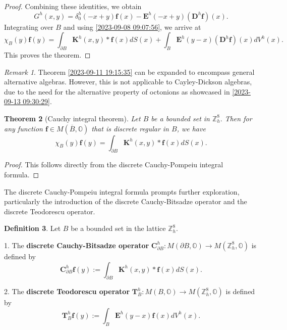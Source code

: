 \documentclass{amsart}
\newtheorem{theorem}{Theorem}[section]
\theoremstyle{definition}
\newtheorem{definition}[theorem]{Definition}
\theoremstyle{remark}
\newtheorem{remark}[theorem]{Remark}
\numberwithin{equation}{section}
\newcommand{\p}{\partial}
\newcommand{\OO}{\mathbb O}
\newcommand{\Z}{\mathbb Z}
\newcommand{\f}{\bm{f}}
\newcommand{\E}{\bm{E}}
\begin{document}
\begin{proof}
Combining these identities, we obtain
\[
G^h(x,y)=\delta_0^h(-x+y)\f(x)- \E^h(-x+y)(\bm D^h \f)(x).
\]
Integrating over \(B\) and using \eqref{2023-09-08 09:07:56}, we arrive at
\[
\chi_B(y)\f(y)=\int_{\p B}\bm K^h(x,y) * \f(x)dS(x)+ \int_B \E^h(y-x)(\bm D^h \f)(x)dV^h(x).
\]
This proves the theorem.
\end{proof}

        \begin{remark}  Theorem    \ref{2023-09-11 19:15:35}
        can be expanded to encompass general alternative algebras. However, this is not applicable to Cayley-Dickson algebras, due to the need for the alternative property of octonions as showcased in \eqref{2023-09-13 09:30:29}.        \end{remark}




     \begin{theorem}
           [Cauchy integral theorem]  Let $B$ be a bounded set in $\Z^8_h.$ Then for any function $\f\in M(\overline B,\OO)$ that is discrete regular in $B$, we have \[
\chi_B(y)\f(y)=\int_{\p B}\bm K^h(x,y) * \f(x)dS(x).
\]
        \end{theorem}

\begin{proof}
	This follows directly from the discrete Cauchy-Pompeiu integral formula. 	
\end{proof}





The discrete Cauchy-Pompeiu integral formula prompts further exploration, particularly the introduction of the discrete Cauchy-Bitsadze operator and the discrete Teodorescu operator.




        \begin{definition}
            Let $B$ be a bounded set in the lattice $\Z^8_h$.

            1. The {\bf discrete Cauchy-Bitsadze operator}   $\bm C^h_{\p B} : M(\p B, \OO) \longrightarrow M(\Z^8_h, \OO)$ is defined by \[
\bm C^h_{\p B}\f (y) := \int_{\p B} \bm K^h(x,y)*\f (x) dS(x).
\]

            2. The  {\bf discrete Teodorescu operator}  $\bm T^ h_ B : M(B, \OO) \longrightarrow M(\Z^8_h, \OO)$ is defined by \[
\bm T^h_B \f (y):= \int_{B} \E^h(y-x)\f(x) dV^h(x).
\]
        \end{definition}
\end{document}
